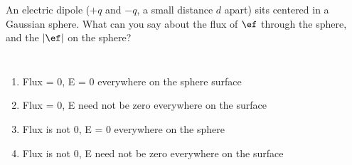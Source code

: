 \documentclass[pdf,aspectratio=169]{beamer}
\begin{document}
\begin{frame}{}
	An electric dipole ($+q$ and $-q$, a small distance $d$ apart) sits centered in a Gaussian sphere. What can you say about the flux of $\ef$ through the sphere, and the $\abs{\ef}$ on the sphere?
	\begin{columns}
		\begin{enumerate}
			\item Flux = 0, E = 0 everywhere on the sphere surface
			\item \alert<2>{Flux = 0, E need not be zero everywhere on the surface}
			\item Flux is not 0, E = 0 everywhere on the sphere
			\item Flux is not 0, E need not be zero everywhere on the surface
		\end{enumerate}
		\begin{center}
		\end{center}
	\end{columns}
\end{frame}


\end{document}

